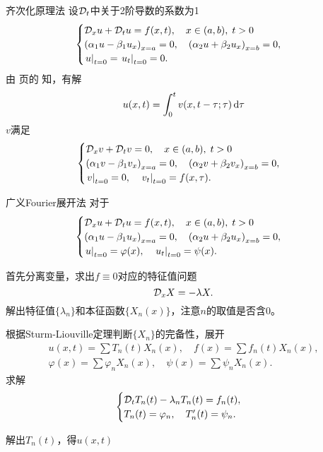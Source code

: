 \begin{method}{齐次化原理法}{}
	设$\mathcal D_t$中关于2阶导数的系数为1
	\begin{align*}
		\begin{cases}
			\mathcal D_xu+\mathcal D_tu=f(x,t),\quad x\in(a,b),\;t>0\\
			\left(\alpha_1u-\beta_1u_x\right)_{x=a}=0,\quad\left(\alpha_2u+\beta_2u_x\right)_{x=b}=0,\\
			\left.u\right\rvert_{t=0}=\left.u_t\right\rvert_{t=0}=0.
		\end{cases}
	\end{align*}
	由 \pageref{thm:Homogeneity Principle} 页的 知，有解
	\[
		u(x,t)=\int_0^tv(x,t-\tau;\tau)\mathop{}\!\mathrm{d}\tau
	\]
	$v$满足
	\begin{align*}
		\begin{cases}
			\mathcal D_xv+\mathcal D_tv=0,\quad x\in(a,b),\;t>0\\
			\left(\alpha_1v-\beta_1v_x\right)_{x=a}=0,\quad\left(\alpha_2v+\beta_2v_x\right)_{x=b}=0,\\
			\left.v\right\rvert_{t=0}=0,\quad\left.v_t\right\rvert_{t=0}=f(x,\tau).
		\end{cases}
	\end{align*}
\end{method}

\begin{method}{广义Fourier展开法}{}
	对于 
	\begin{align*}
		\begin{cases}
			\mathcal D_xu+\mathcal D_tu=f(x,t),\quad x\in(a,b),\;t>0\\
			\left(\alpha_1u-\beta_1u_x\right)_{x=a}=0,\quad\left(\alpha_2u+\beta_2u_x\right)_{x=b}=0,\\
			\left.u\right\rvert_{t=0}=\varphi(x),\quad\left.u_t\right\rvert_{t=0}=\psi(x).
		\end{cases}
	\end{align*}
	\begin{compactenum}
		\item 首先分离变量，求出$f\equiv 0$对应的特征值问题
		\[
			\mathcal D_xX=-\lambda X.
		\]
		解出特征值$\{\lambda_n\}$和本征函数$\{X_n(x)\}$，注意$n$的取值是否含0。
		\item 根据Sturm-Liouville定理判断$\{X_n\}$的完备性，展开
		\begin{gather*}
			u(x,t)=\sum T_n(t)X_n(x),\quad f(x)=\sum f_n(t)X_n(x),\\
			\varphi(x)=\sum\varphi_nX_n(x),\quad \psi(x)=\sum\psi_nX_n(x).
		\end{gather*}
		求解 
		\begin{align*}
			\begin{cases}
				\mathcal D_tT_n(t)-\lambda_nT_n(t)=f_n(t),\\
				T_n(t)=\varphi_n,\quad T_n'(t)=\psi_n.
			\end{cases}
		\end{align*}
		\item 解出$T_n(t)$，得$u(x,t)$
	\end{compactenum}
\end{method}

